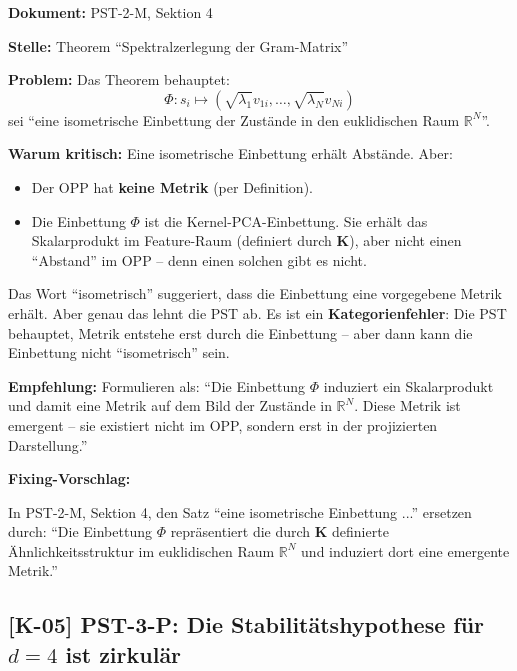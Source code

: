 \documentclass[11pt,a4paper]{article}
\newcommand{\K}[1]{\textbf{[K-#1]}}
\newcommand{\Dok}[1]{\noindent\textbf{Dokument:} #1\par\smallskip}
\newcommand{\Stelle}[1]{\noindent\textbf{Stelle:} #1\par\smallskip}
\newcommand{\Prob}[1]{\noindent\textbf{Problem:} #1\par\smallskip}
\newcommand{\Krit}[1]{\noindent\textbf{Warum kritisch:} #1\par\smallskip}
\newcommand{\Empf}[1]{\noindent\textbf{Empfehlung:} #1\par\smallskip}
\newenvironment{Fix}
  {\par\medskip\noindent\textbf{Fixing-Vorschlag:}\par\nobreak\smallskip}
  {\par\medskip}
\begin{document}
\Dok{PST-2-M, Sektion 4}
\Stelle{Theorem ``Spektralzerlegung der Gram-Matrix''}
\Prob{Das Theorem behauptet:
\[
  \Phi: s_i \mapsto (\sqrt{\lambda_1} v_{1i}, \ldots, \sqrt{\lambda_N} v_{Ni})
\]
sei ``eine isometrische Einbettung der Zustände in den euklidischen
Raum $\mathbb{R}^N$''.}
\Krit{Eine isometrische Einbettung erhält Abstände. Aber:
\begin{itemize}
  \item Der OPP hat \textbf{keine Metrik} (per Definition).
  \item Die Einbettung $\Phi$ ist die Kernel-PCA-Einbettung. Sie erhält
    das Skalarprodukt im Feature-Raum (definiert durch $\mathbf{K}$),
    aber nicht einen ``Abstand'' im OPP -- denn einen solchen gibt es
    nicht.
\end{itemize}
Das Wort ``isometrisch'' suggeriert, dass die Einbettung eine
vorgegebene Metrik erhält. Aber genau das lehnt die PST ab. Es ist
ein \textbf{Kategorienfehler}: Die PST behauptet, Metrik entstehe erst
durch die Einbettung -- aber dann kann die Einbettung nicht
``isometrisch'' sein.}
\Empf{Formulieren als: ``Die Einbettung $\Phi$ induziert ein
Skalarprodukt und damit eine Metrik auf dem Bild der Zustände in
$\mathbb{R}^N$. Diese Metrik ist emergent -- sie existiert nicht im
OPP, sondern erst in der projizierten Darstellung.''}
\begin{Fix}
In PST-2-M, Sektion 4, den Satz ``eine isometrische Einbettung
...'' ersetzen durch: ``Die Einbettung $\Phi$ repräsentiert die
durch $\mathbf{K}$ definierte Ähnlichkeitsstruktur im euklidischen
Raum $\mathbb{R}^N$ und induziert dort eine emergente Metrik.''
\end{Fix}

\subsection{\K{05} PST-3-P: Die Stabilitätshypothese für $d = 4$ ist zirkulär}
\end{document}
